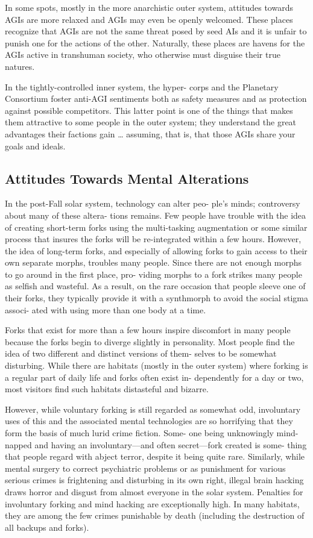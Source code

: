 In some spots, mostly in the more anarchistic outer 
system, attitudes towards AGIs are more relaxed and 
AGIs may even be openly welcomed. These places 
recognize that AGIs are not the same threat posed by 
seed AIs and it is unfair to punish one for the actions 
of the other. Naturally, these places are havens for the 
AGIs active in transhuman society, who otherwise 
must disguise their true natures.

In the tightly-controlled inner system, the hyper-
corps and the Planetary Consortium foster anti-AGI 
sentiments both as safety measures and as protection 
against possible competitors. This latter point is one 
of the things that makes them attractive to some 
people in the outer system; they understand the great 
advantages their factions gain … assuming, that is, 
that those AGIs share your goals and ideals.

\subsection{Attitudes Towards Mental Alterations}

In the post-Fall solar system, technology can alter peo-
ple's minds; controversy about many of these altera-
tions remains. Few people have trouble with the idea 
of creating short-term forks using the multi-tasking 
augmentation or some similar process that insures 
the forks will be re-integrated within a few hours. 
However, the idea of long-term forks, and especially 
of allowing forks to gain access to their own separate 
morphs, troubles many people. Since there are not 
enough morphs to go around in the first place, pro-
viding morphs to a fork strikes many people as selfish 
and wasteful. As a result, on the rare occasion that 
people sleeve one of their forks, they typically provide 
it with a synthmorph to avoid the social stigma associ-
ated with using more than one body at a time.

Forks that exist for more than a few hours inspire 
discomfort in many people because the forks begin to 
diverge slightly in personality. Most people find the 
idea of two different and distinct versions of them-
selves to be somewhat disturbing. While there are 
habitats (mostly in the outer system) where forking 
is a regular part of daily life and forks often exist in-
dependently for a day or two, most visitors find such 
habitats distasteful and bizarre.

However, while voluntary forking is still regarded 
as somewhat odd, involuntary uses of this and the 
associated mental technologies are so horrifying that 
they form the basis of much lurid crime fiction. Some-
one being unknowingly mind-napped and having an 
involuntary—and often secret—fork created is some-
thing that people regard with abject terror, despite it 
being quite rare. Similarly, while mental surgery to 
correct psychiatric problems or as punishment for 
various serious crimes is frightening and disturbing 
in its own right, illegal brain hacking draws horror 
and disgust from almost everyone in the solar system. 
Penalties for involuntary forking and mind hacking 
are exceptionally high. In many habitats, they are 
among the few crimes punishable by death (including 
the destruction of all backups and forks). 

